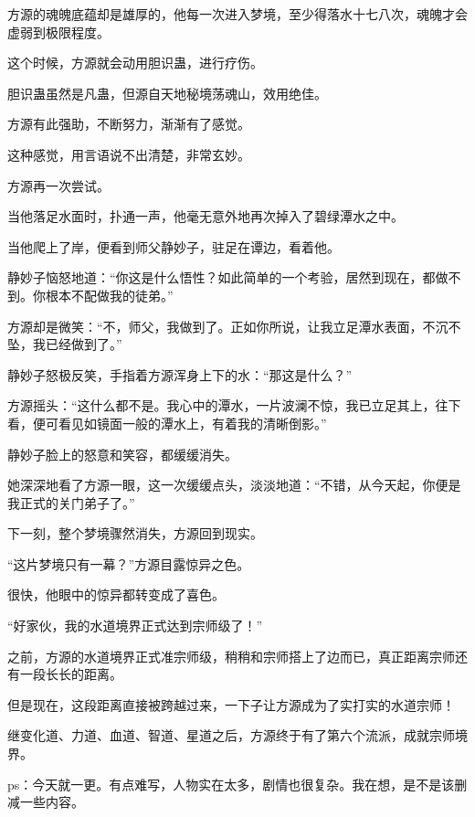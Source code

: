 \begin{this_body}
方源的魂魄底蕴却是雄厚的，他每一次进入梦境，至少得落水十七八次，魂魄才会虚弱到极限程度。

这个时候，方源就会动用胆识蛊，进行疗伤。

胆识蛊虽然是凡蛊，但源自天地秘境荡魂山，效用绝佳。

方源有此强助，不断努力，渐渐有了感觉。

这种感觉，用言语说不出清楚，非常玄妙。

方源再一次尝试。

当他落足水面时，扑通一声，他毫无意外地再次掉入了碧绿潭水之中。

当他爬上了岸，便看到师父静妙子，驻足在谭边，看着他。

静妙子恼怒地道：“你这是什么悟性？如此简单的一个考验，居然到现在，都做不到。你根本不配做我的徒弟。”

方源却是微笑：“不，师父，我做到了。正如你所说，让我立足潭水表面，不沉不坠，我已经做到了。”

静妙子怒极反笑，手指着方源浑身上下的水：“那这是什么？”

方源摇头：“这什么都不是。我心中的潭水，一片波澜不惊，我已立足其上，往下看，便可看见如镜面一般的潭水上，有着我的清晰倒影。”

静妙子脸上的怒意和笑容，都缓缓消失。

她深深地看了方源一眼，这一次缓缓点头，淡淡地道：“不错，从今天起，你便是我正式的关门弟子了。”

下一刻，整个梦境骤然消失，方源回到现实。

“这片梦境只有一幕？”方源目露惊异之色。

很快，他眼中的惊异都转变成了喜色。

“好家伙，我的水道境界正式达到宗师级了！”

之前，方源的水道境界正式准宗师级，稍稍和宗师搭上了边而已，真正距离宗师还有一段长长的距离。

但是现在，这段距离直接被跨越过来，一下子让方源成为了实打实的水道宗师！

继变化道、力道、血道、智道、星道之后，方源终于有了第六个流派，成就宗师境界。

ps：今天就一更。有点难写，人物实在太多，剧情也很复杂。我在想，是不是该删减一些内容。

\end{this_body}

